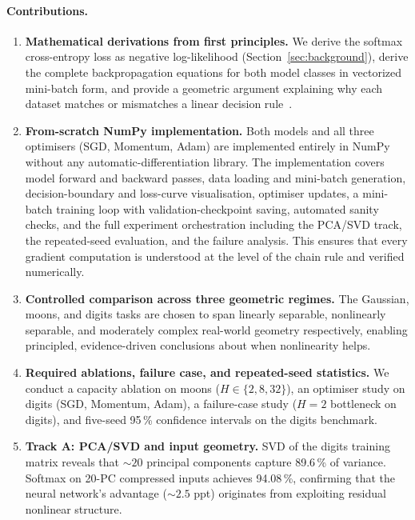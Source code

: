\documentclass[sigconf,screen,nonacm]{acmart}
\newcommand{\1}{\mathbf{1}}
\begin{document}
\paragraph{Contributions.}
\begin{enumerate}[leftmargin=*]
  \item \textbf{Mathematical derivations from first principles.}
        We derive the softmax cross-entropy loss as negative log-likelihood
        (Section~\ref{sec:background}), derive the complete backpropagation
        equations for both model classes in vectorized mini-batch form, and
        provide a geometric argument explaining why each dataset matches or
        mismatches a linear decision rule~\cite{deisenroth2020mml, murphy2022pml}.

  \item \textbf{From-scratch NumPy implementation.}
        Both models and all three optimisers (SGD, Momentum, Adam) are
        implemented entirely in NumPy without any automatic-differentiation
        library.  The implementation covers model forward and backward passes,
        data loading and mini-batch generation, decision-boundary and
        loss-curve visualisation, optimiser updates, a mini-batch training
        loop with validation-checkpoint saving, automated sanity checks, and
        the full experiment orchestration including the PCA/SVD track, the
        repeated-seed evaluation, and the failure analysis.  This ensures that
        every gradient computation is understood at the level of the chain
        rule and verified numerically.

  \item \textbf{Controlled comparison across three geometric regimes.}
        The Gaussian, moons, and digits tasks are chosen to span linearly
        separable, nonlinearly separable, and moderately complex real-world
        geometry respectively, enabling principled, evidence-driven conclusions
        about when nonlinearity helps.

  \item \textbf{Required ablations, failure case, and repeated-seed statistics.}
        We conduct a capacity ablation on moons ($H\in\{2,8,32\}$), an optimiser
        study on digits (SGD, Momentum, Adam), a failure-case study
        ($H{=}2$ bottleneck on digits), and five-seed 95\,\% confidence
        intervals on the digits benchmark.

  \item \textbf{Track A: PCA/SVD and input geometry.}
        SVD of the digits training matrix reveals that ${\sim}20$ principal
        components capture 89.6\,\% of variance.  Softmax on 20-PC compressed
        inputs achieves 94.08\,\%, confirming that the neural network's
        advantage (${\sim}2.5$ ppt) originates from exploiting residual
        nonlinear structure.
\end{enumerate}
\end{document}
